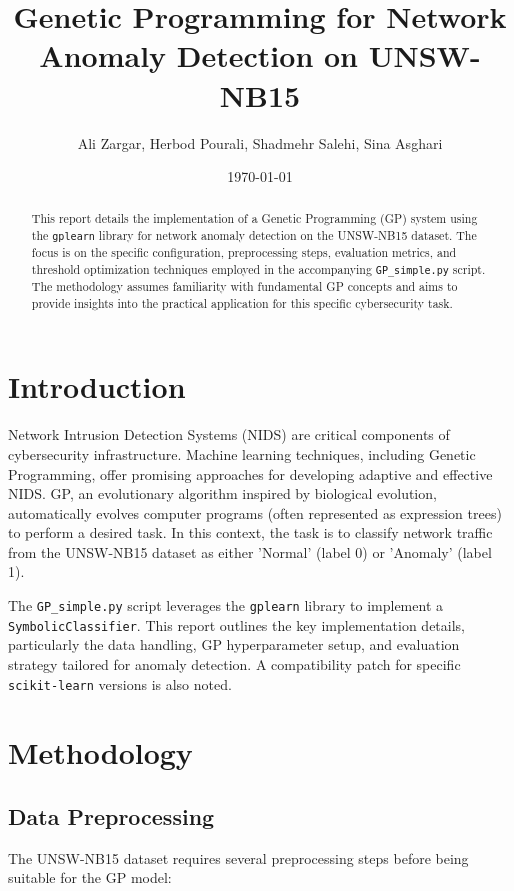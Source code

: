 \documentclass{article}
\title{Genetic Programming for Network Anomaly Detection on UNSW-NB15}
\author{Ali Zargar, Herbod Pourali, Shadmehr Salehi, Sina Asghari}
\date{\today}
\begin{document}
\maketitle

\begin{abstract}
This report details the implementation of a Genetic Programming (GP) system using the \texttt{gplearn} library for network anomaly detection on the UNSW-NB15 dataset. The focus is on the specific configuration, preprocessing steps, evaluation metrics, and threshold optimization techniques employed in the accompanying \texttt{GP\_simple.py} script. The methodology assumes familiarity with fundamental GP concepts and aims to provide insights into the practical application for this specific cybersecurity task.
\end{abstract}

\section{Introduction}
Network Intrusion Detection Systems (NIDS) are critical components of cybersecurity infrastructure. Machine learning techniques, including Genetic Programming, offer promising approaches for developing adaptive and effective NIDS. GP, an evolutionary algorithm inspired by biological evolution, automatically evolves computer programs (often represented as expression trees) to perform a desired task. In this context, the task is to classify network traffic from the UNSW-NB15 dataset \cite{unsw_nb15} as either 'Normal' (label 0) or 'Anomaly' (label 1).

The \texttt{GP\_simple.py} script leverages the \texttt{gplearn} library \cite{gplearn} to implement a \texttt{SymbolicClassifier}. This report outlines the key implementation details, particularly the data handling, GP hyperparameter setup, and evaluation strategy tailored for anomaly detection. A compatibility patch for specific \texttt{scikit-learn} versions is also noted.

\section{Methodology}

\subsection{Data Preprocessing}
The UNSW-NB15 dataset requires several preprocessing steps before being suitable for the GP model:
\end{document}
